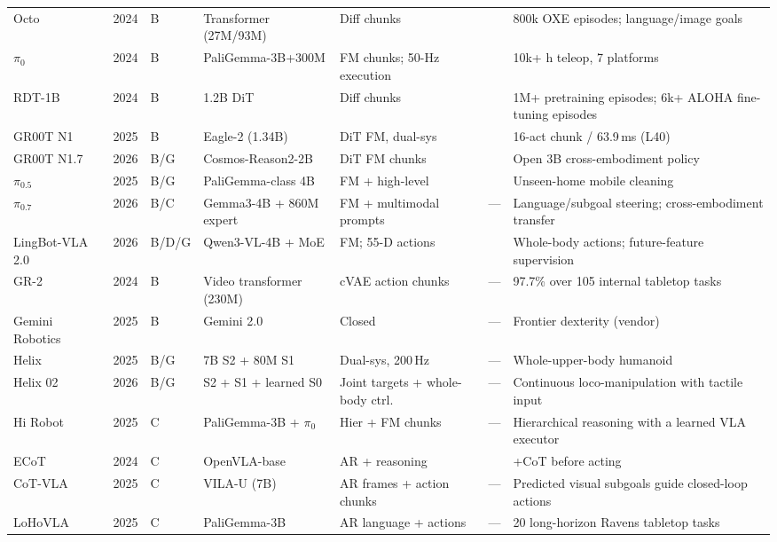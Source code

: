 \documentclass{ieeeaccess}
\newcommand{\cmark}{\ding{51}}
\begin{document}
\begin{table}[!t]
\begin{tabular}{p{2.5cm}p{0.7cm}p{0.7cm}p{2.2cm}p{2.0cm}p{0.7cm}p{5.5cm}}
Octo~\cite{octo} & 2024 & B & Transformer (27M/93M) & Diff chunks & \cmark & 800k OXE episodes; language/image goals \\
$\pi_0$~\cite{pi0} & 2024 & B & PaliGemma-3B+300M & FM chunks; 50-Hz execution & \cmark & 10k+ h teleop, 7 platforms \\
RDT-1B~\cite{rdt1b} & 2024 & B & 1.2B DiT & Diff chunks & \cmark & 1M+ pretraining episodes; 6k+ ALOHA fine-tuning episodes \\
GR00T N1~\cite{groot} & 2025 & B & Eagle-2 (1.34B) & DiT FM, dual-sys & \cmark & 16-act chunk / 63.9\,ms (L40) \\
GR00T N1.7~\cite{grootn17} & 2026 & B/G & Cosmos-Reason2-2B & DiT FM chunks & \cmark & Open 3B cross-embodiment policy \\
$\pi_{0.5}$~\cite{pi05} & 2025 & B/G & PaliGemma-class 4B & FM + high-level & \cmark & Unseen-home mobile cleaning \\
$\pi_{0.7}$~\cite{pi07} & 2026 & B/C & Gemma3-4B + 860M expert & FM + multimodal prompts & --- & Language/subgoal steering; cross-embodiment transfer \\
LingBot-VLA 2.0~\cite{lingbotvla2} & 2026 & B/D/G & Qwen3-VL-4B + MoE & FM; 55-D actions & \cmark & Whole-body actions; future-feature supervision \\
GR-2~\cite{gr2} & 2024 & B & Video transformer (230M) & cVAE action chunks & --- & 97.7\% over 105 internal tabletop tasks \\
Gemini Robotics~\cite{geminirobotics} & 2025 & B & Gemini 2.0 & Closed & --- & Frontier dexterity (vendor) \\
Helix~\cite{helix} & 2025 & B/G & 7B S2 + 80M S1 & Dual-sys, 200\,Hz & --- & Whole-upper-body humanoid \\
Helix 02~\cite{helix02} & 2026 & B/G & S2 + S1 + learned S0 & Joint targets + whole-body ctrl. & --- & Continuous loco-manipulation with tactile input \\
Hi Robot~\cite{hirobot} & 2025 & C & PaliGemma-3B + $\pi_0$ & Hier + FM chunks & --- & Hierarchical reasoning with a learned VLA executor \\
ECoT~\cite{ecot} & 2024 & C & OpenVLA-base & AR + reasoning & \cmark & +CoT before acting \\
CoT-VLA~\cite{cotvla} & 2025 & C & VILA-U (7B) & AR frames + action chunks & --- & Predicted visual subgoals guide closed-loop actions \\
LoHoVLA~\cite{lohovla} & 2025 & C & PaliGemma-3B & AR language + actions & --- & 20 long-horizon Ravens tabletop tasks \\

\end{tabular}
\end{table}
\end{document}
